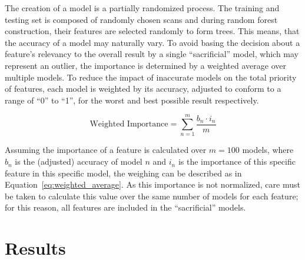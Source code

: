 
The creation of a model is a partially randomized process. The training and 
testing set is composed of randomly chosen scans and during random forest 
construction, their features are selected randomly to form trees. This means,
that the accuracy of a model may naturally vary.
To avoid basing the decision about a feature's relevancy to the overall result
by a single \enquote{sacrificial} model, which may represent an outlier, the 
importance is determined by a weighted average over multiple models. To reduce 
the impact of inaccurate 
models on the total priority of features, each model is weighted by its 
accuracy, adjusted to conform to a range of \enquote{0} to \enquote{1}, for 
the worst and best possible result respectively. 

\begin{equation} \label{eq:weighted_average}
    \text{Weighted Importance} = \sum_{n=1}^{m} \frac{b_n \cdot i_n}{m}
\end{equation}

Assuming the importance of 
a feature is calculated over \(m = 100\) models, where \( b_n \) is the 
(adjusted) accuracy of model \(n\) and \(i_n\) is the importance of this 
specific feature in this specific model, the weighing can be described as in
Equation~\ref{eq:weighted_average}. As this importance is not normalized, care
must be taken to calculate this value over the same number of models for each 
feature; for this reason, all features are included in the \enquote{sacrificial}
models.



















\newpage{}
\section{Results}\label{sec:results}

